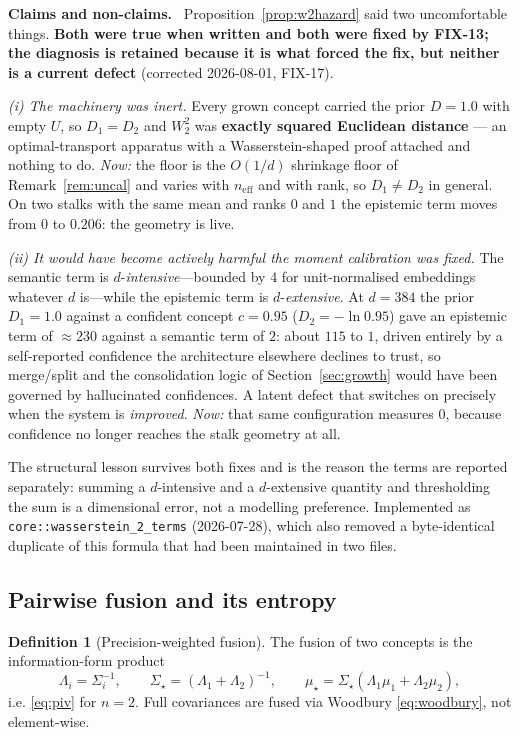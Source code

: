 \documentclass[11pt]{article}
\theoremstyle{definition}
\newtheorem{definition}{Definition}[section]
\theoremstyle{plain}
\theoremstyle{remark}
\newcommand{\Hon}{\noindent\textbf{\color{honestycol}Claims and non-claims.}\ }
\begin{document}
\begin{hon}\Hon
Proposition~\ref{prop:w2hazard} said two uncomfortable things. \textbf{Both were
true when written and both were fixed by FIX-13; the diagnosis is retained
because it is what forced the fix, but neither is a current defect} (corrected
2026-08-01, FIX-17).

\emph{(i) The machinery was inert.} Every grown concept carried the prior $D=1.0$
with empty $U$, so $D_1=D_2$ and $W_2^2$ was \textbf{exactly squared Euclidean
distance} --- an optimal-transport apparatus with a Wasserstein-shaped proof
attached and nothing to do. \emph{Now:} the floor is the $O(1/d)$ shrinkage floor
of Remark~\ref{rem:uncal} and varies with $n_{\mathrm{eff}}$ and with rank, so
$D_1\neq D_2$ in general. On two stalks with the same mean and ranks $0$ and $1$
the epistemic term moves from $0$ to $0.206$: the geometry is live.

\emph{(ii) It would have become actively harmful the moment calibration was
fixed.} The semantic term is $d$-\emph{intensive}---bounded by $4$ for
unit-normalised embeddings whatever $d$ is---while the epistemic term is
$d$-\emph{extensive}. At $d=384$ the prior $D_1=1.0$ against a confident concept
$c=0.95$ ($D_2=-\ln0.95$) gave an epistemic term of $\approx230$ against a
semantic term of $2$: about $115$ to $1$, driven entirely by a self-reported
confidence the architecture elsewhere declines to trust, so merge/split and the
consolidation logic of Section~\ref{sec:growth} would have been governed by
hallucinated confidences. A latent defect that switches on precisely when the
system is \emph{improved}. \emph{Now:} that same configuration measures $0$,
because confidence no longer reaches the stalk geometry at all.

The structural lesson survives both fixes and is the reason the terms are
reported separately: summing a $d$-intensive and a $d$-extensive quantity and
thresholding the sum is a dimensional error, not a modelling preference.
Implemented as \texttt{core::wasserstein\_2\_terms} (2026-07-28), which also
removed a byte-identical duplicate of this formula that had been maintained in
two files.
\end{hon}

\subsection{Pairwise fusion and its entropy}

\begin{definition}[Precision-weighted fusion]
The fusion of two concepts is the information-form product
\begin{equation}\label{eq:merge}
\Lambda_i=\Sigma_i^{-1},\qquad
\Sigma_\star=(\Lambda_1+\Lambda_2)^{-1},\qquad
\mu_\star=\Sigma_\star(\Lambda_1\mu_1+\Lambda_2\mu_2),
\end{equation}
i.e. \eqref{eq:piv} for $n=2$. Full covariances are fused via Woodbury
\eqref{eq:woodbury}, not element-wise.
\end{definition}
\end{document}
